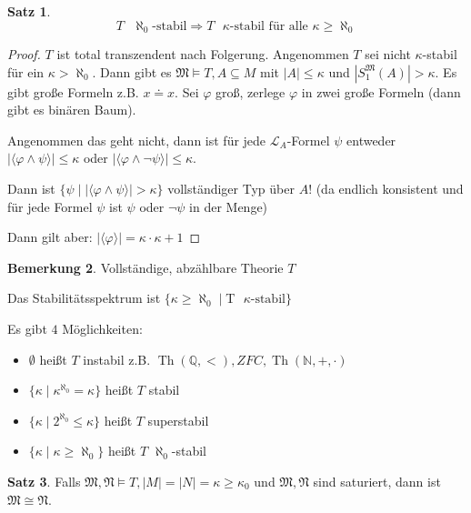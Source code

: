 \documentclass[12pt,parskip=full]{scrartcl}
\newcommand{\setN}{\mathbb{N}}
\newcommand{\setQ}{\mathbb{Q}}
\newcommand{\abs}[1]{{\left| #1 \right|}}
\theoremstyle{definition}
\newtheorem{theorem}{Satz}[section]
\newtheorem{remark}[theorem]{Bemerkung}
\begin{document}
 	\begin{theorem}
 		\begin{equation*}
	 		\text{$T$ $\aleph_0$-stabil} \Rightarrow \text{$T$ $\kappa$-stabil für alle $\kappa \geq \aleph_0$}
 		\end{equation*}
 	\end{theorem}
 
 	\begin{proof}
 		$T$ ist total transzendent nach Folgerung. Angenommen $T$ sei nicht $\kappa$-stabil für ein $\kappa > \aleph_0$. Dann gibt es $\mathfrak{M} \models T, A \subseteq M$ mit $\abs{A} \leq \kappa$ und $\abs{S_1^\mathfrak{M}(A)} > \kappa$. Es gibt große Formeln z.B. $x \doteq x$. Sei $\varphi$ groß, zerlege $\varphi$ in zwei große Formeln (dann gibt es binären Baum).
 		
 		Angenommen das geht nicht, dann ist für jede $\mathcal{L}_A$-Formel $\psi$ entweder $\abs{\langle \varphi \land \psi \rangle} \leq \kappa$ oder $\abs{\langle \varphi \land \lnot \psi \rangle } \leq \kappa$.
 		
 		Dann ist $\{ \psi \mid \abs{ \langle \varphi \land \psi \rangle } > \kappa \}$ vollständiger Typ über $A$! (da endlich konsistent und für jede Formel $\psi$ ist $\psi$ oder $\lnot \psi$ in der Menge)
 		
 		Dann gilt aber: $\abs{\langle \varphi \rangle} = \kappa \cdot \kappa + 1$
 	\end{proof}
 
 	\begin{remark}
 		Vollständige, abzählbare Theorie $T$
 		
 		Das Stabilitätsspektrum ist $\{ \kappa \geq \aleph_0 \mid $T$ \text{ $\kappa$-stabil} \}$
 		
 		Es gibt $4$ Möglichkeiten:
 		\begin{itemize}
 			\item $\emptyset$ heißt $T$ instabil z.B. $\operatorname{Th}(\setQ, <), ZFC, \operatorname{Th}(\setN, +, \cdot)$
 			\item $\{ \kappa \mid \kappa^{\aleph_0} = \kappa \}$ heißt $T$ stabil
 			\item $\{ \kappa \mid 2^{\aleph_0} \leq \kappa \}$ heißt $T$ superstabil
 			\item $\{ \kappa \mid \kappa \geq \aleph_0 \}$ heißt $T$ $\aleph_0$-stabil
 		\end{itemize}
 	\end{remark}
 
 	\begin{theorem}
 		Falls $\mathfrak{M}, \mathfrak{N} \models T, \abs{M} = \abs{N} = \kappa \geq \kappa_0$ und $\mathfrak{M}, \mathfrak{N}$ sind saturiert, dann ist $\mathfrak{M} \cong \mathfrak{N}$.
 	\end{theorem}
 
\end{document}
